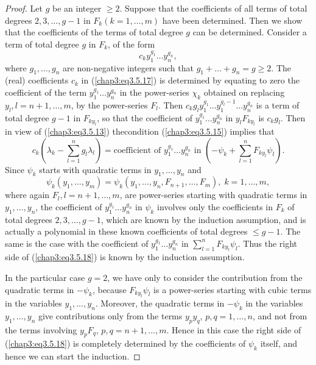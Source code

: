 \begin{proof}
Let $g$ be an integer $\geq 2 $. Suppose that the coefficients of all
terms of total degrees $2,3, \ldots, g-1$ in $F_k(k = 1, \ldots,m)$
have been determined. Then we show that the coefficients of the terms
of total degree $g$ can be determined. Consider a term of total degree
$g$  in $F_k$, of the form  
\begin{equation*}
c_k y^{g_1}_1 \ldots y^{g_n}_n, \tag{3.5.17}\label{chap3:eq3.5.17}
\end{equation*}
where $g_1 , \ldots, g_n$ are non-negative integers such that $g_1 +
\ldots + g_n = g \geq 2$. The (real) coefficients $c_k$ in
(\ref{chap3:eq3.5.17}) is determined by equating to zero the
coefficient of the term $y^{g_1}_1 \ldots y^{g_n}_n$ in the
power-series $\chi_k$ obtained on replacing $y_l, l = n + 1, \ldots,
m$, by the power-series $F_l$. Then $c_k g_l y^{g_1}_1 \ldots y^{g_l
  -1}_1 \ldots  y^{g_n}_n $ is a term of total degree $g-1$ in
$F_{ky_l}$, so that the coefficient of $y^{g_1}_1 \ldots y^{g_n}_n$ in
$y_l F_{ky_l}$ is $c_k g_l$. Then in view of (\ref{chap3:eq3.5.13})
the\pageoriginale condition (\ref{chap3:eq3.5.15}) implies that 
\begin{equation*}
c_k(\lambda_k - \sum\limits^n_{l=1} g_l \lambda_l) = \text{
  coefficient of } y^{g_1}_1 \ldots y^{g_n}_n \text{ in } (-\psi_k +
\sum\limits^n_{l=1} F_{ky_l}
\psi_l). \tag{3.5.18}\label{chap3:eq3.5.18} 
\end{equation*}
Since $\psi_k$ starts with quadratic terms in $y_1, \ldots, y_n$ and 
$$
\psi_k (y_1, \ldots, y_m) = \psi_k (y_1, \ldots, y_n, F_{n+1}, \ldots,
F_m) , \; k = 1, \ldots, m,  
$$
where again $F_l, l = n +1, \ldots, m$, are power-series starting with
quadratic terms in $y_1, \ldots, y_n$, the coefficient of $y^{g_1}_1
\ldots y^{g_n}_n$ in $\psi_k$ involves only the coefficients in $F_k$
of total degrees $2,3, \ldots, g-1$, which are known by the induction
assumption, and is actually a polynomial in these known coefficients
of total degrees $\leq g -1$. The same is the case with the
coefficient of $y^{g_1}_1 \ldots y^{g_n}_n$ in $\sum\limits^{n}_{l=1}
F_{ky_l} \psi_l$. Thus the right side of (\ref{chap3:eq3.5.18}) is
known by the induction assumption. 

In the particular case $g =2$, we have only to consider the
contribution from the quadratic terms in $-\psi_k$, because $F_{ky_l}
\psi_l$ is a power-series starting with cubic terms in the variables
$y_1, \ldots, y_n$. Moreover, the quadratic terms in $-\psi_k$ in the
variables $y_1, \ldots, y_n$ give contributions only from the terms
$y_p y_q$, $p,q = 1, \ldots, n$, and not from the terms involving $y_p
F_q$, $p,q = n+1, \ldots, m$. Hence in this case the right side of
(\ref{chap3:eq3.5.18}) is completely determined by the coefficients of
$\psi_k$ itself, and hence we can start the induction. 


\end{proof}
